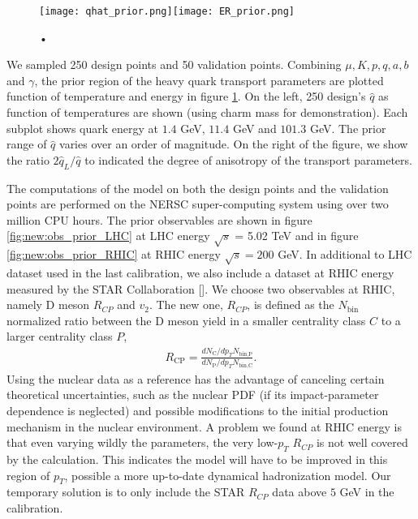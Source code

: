 \begin{figure}
\centering
\texttt{[image: qhat\_prior.png]}\texttt{[image: ER\_prior.png]}
\caption{•}
\label{fig:new:design-qhat}
\end{figure}

We sampled 250 design points and 50 validation points. 
Combining $\mu, K, p, q, a, b$ and $\gamma$, the prior region of the heavy quark transport parameters are plotted function of temperature and energy in figure \ref{fig:new:design-qhat}. 
On the left, 250 design's $\hat{q}$ as function of temperatures are shown  (using charm mass for demonstration).
Each subplot shows quark energy at $1.4$ GeV, $11.4$ GeV and $101.3$ GeV.
The prior range of $\hat{q}$ varies over an order of magnitude.
On the right of the figure, we show the ratio $2\hat{q}_L/\hat{q}$ to indicated the degree of anisotropy of the transport parameters.

The computations of the model on both the design points and the validation points are performed on the NERSC super-computing system using over two million CPU hours.
The prior observables are shown in figure \ref{fig:new:obs_prior_LHC} at LHC energy $\sqrt{s}$ = 5.02 TeV and in figure \ref{fig:new:obs_prior_RHIC} at RHIC energy $\sqrt{s} = 200$ GeV.
In additional to LHC dataset used in the last calibration, we also include a dataset at RHIC energy measured by the STAR Collaboration [].
We choose two observables at RHIC, namely D meson $R_{CP}$ and $v_2$. 
The new one, $R_{CP}$, is defined as the $N_{\textrm{bin}}$ normalized ratio between the D meson yield in a smaller centrality class $C$ to a larger centrality class $P$,
\begin{eqnarray}
R_{\textrm{CP}} = \frac{dN_\textrm{C}/dp_T N_{\textrm{bin,P}}}{dN_\textrm{P}/dp_T N_{\textrm{bin,C}}}.
\end{eqnarray}
Using the nuclear data as a reference has the advantage of canceling certain theoretical uncertainties, such as the nuclear PDF (if its impact-parameter dependence is neglected) and possible modifications to the initial production mechanism in the nuclear environment.
A problem we found at RHIC energy is that even varying wildly the parameters, the very low-$p_T$ $R_{CP}$ is not well covered by the calculation. 
This indicates the model will have to be improved in this region of $p_T$, possible a more up-to-date dynamical hadronization model.
Our temporary solution is to only include the STAR $R_{CP}$ data above $5$ GeV in the calibration.

